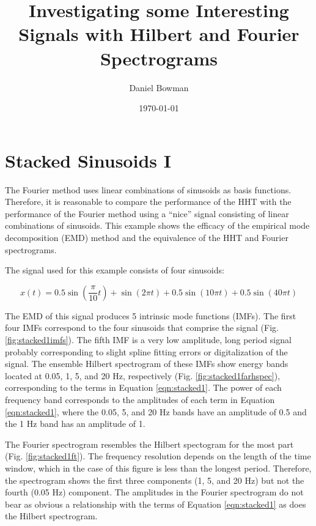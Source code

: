 \documentclass[12pt]{article}
\begin{document}
\title{Investigating some Interesting Signals with Hilbert and Fourier Spectrograms}
\author{Daniel Bowman}
\date{\today}
\maketitle
\tableofcontents


\section{Stacked Sinusoids I}

The Fourier method uses linear combinations of sinusoids as basis functions.
Therefore, it is reasonable to compare the performance of the HHT with the performance of the Fourier method
using a ``nice'' signal consisting of linear combinations of sinusoids.
This example shows the efficacy of the empirical mode decomposition (EMD) method and the equivalence of the HHT and Fourier spectrograms. 

The signal used for this example consists of four sinusoids: 

\begin{equation}
\label{eqn:stacked1}
x(t) =0.5\sin(\frac{\pi}{10} t) + \sin(2\pi t) + 0.5\sin(10\pi t) + 0.5\sin(40\pi t)
\end{equation}

The EMD of this signal produces 5 intrinsic mode functions (IMFs).
The first four IMFs correspond to the four sinusoids that comprise the signal (Fig. \ref{fig:stacked1imfs}).
The fifth IMF is a very low amplitude, long period signal probably corresponding to slight spline fitting errors or digitalization of the signal.
The ensemble Hilbert spectrogram of these IMFs show energy bands located at 0.05, 1, 5, and 20 Hz, respectively (Fig. \ref{fig:stacked1farhspec}), 
corresponding to the terms in Equation \ref{eqn:stacked1}.
The power of each frequency band corresponds to the amplitudes of each term in Equation \ref{eqn:stacked1}, where the 0.05, 5, and 20 Hz bands have
an amplitude of 0.5 and the 1 Hz band has an amplitude of 1.

The Fourier spectrogram resembles the Hilbert spectogram for the most part (Fig. \ref{fig:stacked1ft}).
The frequency resolution depends on the length of the time window, which in the case of this figure is less than the longest period.
Therefore, the spectrogram shows the first three components (1, 5, and 20 Hz) but not the fourth (0.05 Hz) component.
The amplitudes in the Fourier spectrogram do not bear as obvious a relationship with the terms of Equation \ref{eqn:stacked1} as does the Hilbert spectrogram.
\end{document}
